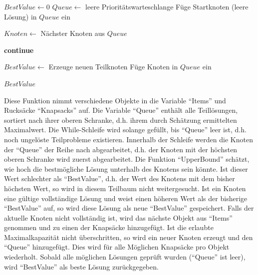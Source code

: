 \begin{algorithmic}
        \State $BestValue \gets 0$
        \State $Queue \gets$ leere Prioritätswarteschlange
        \State Füge Startknoten (leere Lösung) in $Queue$ ein
    
            \State $Knoten \gets$ Nächster Knoten aus $Queue$
            
                \State \textbf{continue} 
            \EndIf
    
                \State $BestValue \gets$ 
            \Else
                    \State Erzeuge neuen Teilknoten
                        \State Füge Knoten in $Queue$ ein
                    \EndIf
                \EndFor
            \EndIf
        \EndWhile
    
        \State \Return $BestValue$
    \EndFunction
    \end{algorithmic}
Diese Funktion nimmt verschiedene Objekte in die Variable \enquote{Items} und Rucksäcke \enquote{Knapsacks} auf. Die Variable \enquote{Queue} enthält alle Teillösungen, sortiert nach ihrer oberen Schranke, d.h. ihrem durch Schätzung ermittelten Maximalwert. Die While-Schleife wird solange gefüllt, bis \enquote{Queue} leer ist, d.h. noch ungelöste Teilprobleme existieren. Innerhalb der Schleife werden die Knoten der \enquote{Queue} der Reihe nach abgearbeitet, d.h. der Knoten mit der höchsten oberen Schranke wird zuerst abgearbeitet. Die Funktion \enquote{UpperBound} schätzt, wie hoch die bestmögliche Lösung unterhalb des Knotens sein könnte. Ist dieser Wert schlechter als \enquote{BestValue}, d.h. der Wert des Knotens mit dem bisher höchsten Wert, so wird in diesem Teilbaum nicht weitergesucht. Ist ein Knoten eine gültige vollständige Lösung und weist einen höheren Wert als der bisherige \enquote{BestValue} auf, so wird diese Lösung als neue \enquote{BestValue} gespeichert. Falls der aktuelle Knoten nicht vollständig ist, wird das nächste Objekt aus \enquote{Items} genommen und zu einen der Knapsäcke hinzugefügt. Ist die erlaubte Maximalkapazität nicht überschritten, so wird ein neuer Knoten erzeugt und den \enquote{Queue} hinzugefügt. Dies wird für alle Möglichen Knapsäcke pro Objekt wiederholt. Sobald alle möglichen Lösungen geprüft wurden (\enquote{Queue} ist leer), wird \enquote{BestValue} als beste Lösung zurückgegeben.  

